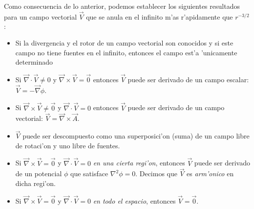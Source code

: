 Como consecuencia de lo anterior, podemos establecer los siguientes resultados
para un campo vectorial $\vec V$ que se anula en el infinito m'as
r'apidamente que $r^{-3/2}$:
\begin{itemize}
\item Si la divergencia y el rotor de un campo vectorial son conocidos y si
este campo no tiene fuentes en el infinito, entonces el campo est'a 'unicamente
determinado
\item Si $\vec\nabla\cdot\vec V\neq 0$ y $\vec\nabla\times\vec V=\vec 0$
entonces $\vec V$ puede ser derivado de un campo escalar: $\vec
V=-\vec\nabla\phi$.
\item Si $\vec\nabla\times\vec V\neq \vec 0$ y $\vec\nabla\cdot\vec V= 0$
entonces $\vec V$ puede ser derivado de un campo vectorial: $\vec
V=\vec\nabla\times\vec A$.
\item $\vec{V}$ puede ser descompuesto como una superposici'on (suma) de un
campo libre de rotaci'on y uno libre de fuentes.
\item Si $\vec\nabla\times\vec V=\vec 0$ y $\vec\nabla\cdot\vec V= 0$ \textit{en
una cierta regi'on}, entonces $\vec V$ puede ser derivado de un potencial $\phi$
que satisface $\nabla^2\phi=0$. Decimos que $\vec V$ es \textit{arm'onico} en
dicha regi'on.
\item Si $\vec\nabla\times\vec V=\vec 0$ y $\vec\nabla\cdot\vec V= 0$ \textit{en
todo el espacio}, entonces $\vec V=\vec 0$.
\end{itemize}



